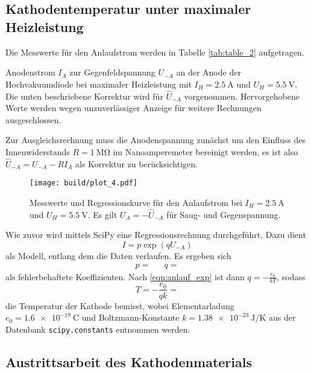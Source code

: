 \newpage
\subsection{Kathodentemperatur unter maximaler Heizleistung}

Die Messwerte für den Anlaufstrom werden in Tabelle \ref{tab:table_2} aufgetragen. 

\begin{table}[H]
	\caption{Anodenstrom $I_A$ zur Gegenfeldspannung $U_{-A}$ an der Anode der Hochvakuumdiode bei maximaler Heizleistung mit
			 $I_H = \qty{2.5}{\ampere}$ und $U_H = \qty{5.5}{\volt}$. Die unten beschriebene Korrektur wird für $\hat{U}_{-A}$
			 vorgenommen. \mbox{Hervorgehobene} Werte werden wegen unzuverlässiger Anzeige für weitere Rechnungen ausgeschlossen. }
	\centering
	
	\label{tab:table_2}
\end{table}

Zur Ausgleichsrechnung muss die Anodenspannung zunächst um den Einfluss des Innenwiderstands $R = \qty{1}{\mega\ohm}$ im
Nanoamperemeter bereinigt werden, es ist also $\hat U_{-A} = U_{-A} - RI_A$ als Korrektur zu berücksichtigen. 

\begin{figure}[H]
	\texttt{[image: build/plot\_4.pdf]}
	\caption{Messwerte und Regressionskurve für den Anlaufstrom bei $I_H = \qty{2.5}{\ampere}$ und $U_H = \qty{5.5}{\volt}$. Es gilt
			 $U_A = -\hat{U}_{-A}$ für Saug- und Gegenspannung.}
	\label{fig:plot_4}
\end{figure}

Wie zuvor wird mittels SciPy \cite{scipy} eine Regressionsrechnung durchgeführt. Dazu dient
\begin{equation*}
	I = p \exp(q U_{-A})
\end{equation*}
als Modell, entlang dem die Daten verlaufen. Es ergeben sich
\begin{align*}
	p =  && q = 
\end{align*}
als fehlerbehaftete Koeffizienten. Nach \eqref{eqn:anlauf_exp} ist dann $q = -\frac{e_0}{kT}$, sodass
\begin{equation*}
	T = -\frac{e_0}{qk} = 
\end{equation*}
die Temperatur der Kathode bemisst, wobei Elementarladung $e_0 = \qty{1.6e-19}{\coulomb}$ und Boltzmann-Konstante
$k = \qty{1.38e-23}{\joule\per\kelvin}$ aus der Datenbank \verb+scipy.constants+ entnommen werden.

\subsection{Austrittsarbeit des Kathodenmaterials}

